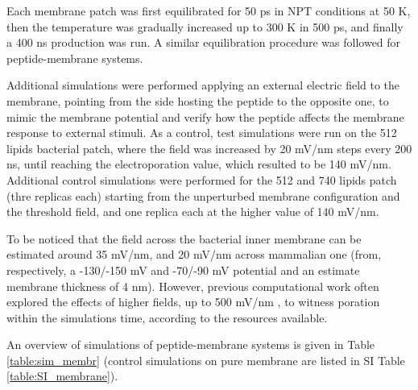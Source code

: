 Each membrane patch was first equilibrated for 50 ps in NPT conditions at 50 K, then the temperature was gradually increased up to 300 K in 500 ps, and finally a 400 ns production was run. A similar equilibration procedure was followed for peptide-membrane systems.

Additional simulations were performed applying an external electric field to the membrane, pointing from the side hosting the peptide to the opposite one, to mimic the membrane potential and verify how the peptide affects the membrane response to external stimuli.
%
As a control, test simulations were run on the 512 lipids bacterial patch, where the field was increased by 20 mV/nm steps every 200 ns, until reaching the electroporation value, which resulted to be 140 mV/nm.
%
Additional control simulations were performed for the 512 and 740 lipids patch (thre replicas each) starting from the unperturbed membrane configuration and the threshold field, and one replica each at the higher value of 140 mV/nm.

To be noticed that the field across the bacterial inner membrane can be estimated around 35 mV/nm, and 20 mV/nm across mammalian one (from, respectively, a -130/-150 mV and -70/-90 mV potential \citep{Yeaman2003,Wilson2011} and an estimate membrane thickness of 4 nm). However, previous computational work often explored the effects of higher fields, up to 500 mV/nm \citep{Tieleman2004, Bockmann2008, Piggot2011}, to witness poration within the simulations time, according to the resources available.

An overview of simulations of peptide-membrane systems is given in Table \ref{table:sim_membr} (control simulations on pure membrane are listed in SI Table \ref{table:SI_membrane}).

